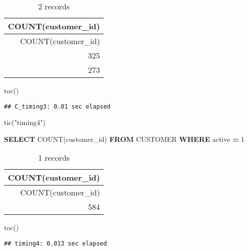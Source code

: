 \documentclass[
]{article}
\newenvironment{Shaded}{\begin{snugshade}}{\end{snugshade}}
\newcommand{\DecValTok}[1]{\textcolor[rgb]{0.00,0.00,0.81}{#1}}
\newcommand{\FunctionTok}[1]{\textcolor[rgb]{0.00,0.00,0.00}{#1}}
\newcommand{\KeywordTok}[1]{\textcolor[rgb]{0.13,0.29,0.53}{\textbf{#1}}}
\newcommand{\NormalTok}[1]{#1}
\newcommand{\OperatorTok}[1]{\textcolor[rgb]{0.81,0.36,0.00}{\textbf{#1}}}
\newcommand{\StringTok}[1]{\textcolor[rgb]{0.31,0.60,0.02}{#1}}
\begin{document}
\begin{longtable}[]{@{}r@{}}
\caption{2 records}\tabularnewline
\toprule
COUNT(customer\_id) \\
\midrule
\endfirsthead
\toprule
COUNT(customer\_id) \\
\midrule
\endhead
325 \\
273 \\
\bottomrule
\end{longtable}

\begin{Shaded}
\begin{Highlighting}[]
\FunctionTok{toc}\NormalTok{()}
\end{Highlighting}
\end{Shaded}

\begin{verbatim}
## C_timing3: 0.01 sec elapsed
\end{verbatim}

\begin{Shaded}
\begin{Highlighting}[]
\FunctionTok{tic}\NormalTok{(}\StringTok{"timing4"}\NormalTok{)}
\end{Highlighting}
\end{Shaded}

\begin{Shaded}
\begin{Highlighting}[]
\KeywordTok{SELECT} \FunctionTok{COUNT}\NormalTok{(customer\_id)}
\KeywordTok{FROM}\NormalTok{ CUSTOMER}
\KeywordTok{WHERE}\NormalTok{ active }\OperatorTok{=} \DecValTok{1}
\end{Highlighting}
\end{Shaded}

\begin{longtable}[]{@{}r@{}}
\caption{1 records}\tabularnewline
\toprule
COUNT(customer\_id) \\
\midrule
\endfirsthead
\toprule
COUNT(customer\_id) \\
\midrule
\endhead
584 \\
\bottomrule
\end{longtable}

\begin{Shaded}
\begin{Highlighting}[]
\FunctionTok{toc}\NormalTok{()}
\end{Highlighting}
\end{Shaded}

\begin{verbatim}
## timing4: 0.013 sec elapsed
\end{verbatim}
\end{document}
